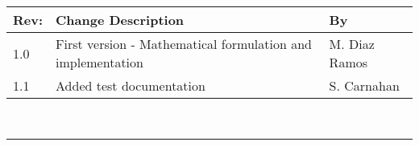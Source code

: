 \documentclass[]{BasiliskReportMemo}
\begin{document}
\makeCover

%
%
\pagestyle{empty}
{\renewcommand{\arraystretch}{2}
	\noindent
	\begin{longtable}{|p{0.5in}|p{4.5in}|p{1.14in}|}
		\hline
		{\bfseries Rev}: & {\bfseries Change Description} & {\bfseries By} \\
		\hline
		1.0 & First version - Mathematical formulation and implementation & M. Diaz Ramos \\
		\hline
		1.1 & Added test documentation & S. Carnahan \\
		\hline
		
	\end{longtable}
}

\newpage
\setcounter{page}{1}
\pagestyle{fancy}

\tableofcontents %
~\\ \hrule ~\\ %
	








\end{document}
